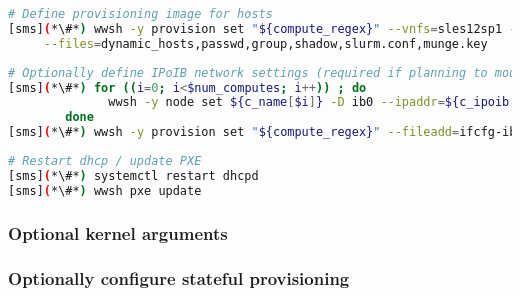 \documentclass[letterpaper]{article}
\begin{document}
\begin{lstlisting}[language=bash,keywords={},upquote=true,basicstyle=\footnotesize\ttfamily]
# Define provisioning image for hosts
[sms](*\#*) wwsh -y provision set "${compute_regex}" --vnfs=sles12sp1 --bootstrap=`uname -r` \
     --files=dynamic_hosts,passwd,group,shadow,slurm.conf,munge.key
\end{lstlisting}

\begin{lstlisting}[language=bash,keywords={},upquote=true,basicstyle=\footnotesize\ttfamily]
# Optionally define IPoIB network settings (required if planning to mount Lustre over IB)
[sms](*\#*) for ((i=0; i<$num_computes; i++)) ; do
              wwsh -y node set ${c_name[$i]} -D ib0 --ipaddr=${c_ipoib[$i]} --netmask=${ipoib_netmask}
        done
[sms](*\#*) wwsh -y provision set "${compute_regex}" --fileadd=ifcfg-ib0.ww
\end{lstlisting}



\begin{lstlisting}[language=bash,keywords={},upquote=true,basicstyle=\footnotesize\ttfamily]
# Restart dhcp / update PXE
[sms](*\#*) systemctl restart dhcpd
[sms](*\#*) wwsh pxe update
\end{lstlisting}



\subsubsection{Optional kernel arguments} \label{sec:optional_kargs}


\subsubsection{Optionally configure stateful provisioning}

\end{document}
